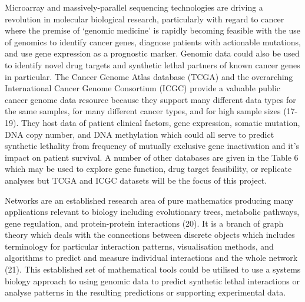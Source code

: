 Microarray and massively-parallel sequencing technologies are driving a revolution in molecular biological research, particularly with regard to cancer where the premise of ‘genomic medicine’ is rapidly becoming feasible with the use of genomics to identify cancer genes, diagnose patients with actionable mutations, and use gene expression as a prognostic marker. Genomic data could also be used to identify novel drug targets and synthetic lethal partners of known cancer genes in particular. The Cancer Genome Atlas database (TCGA) and the overarching International Cancer Genome Consortium (ICGC) provide a valuable public cancer genome data resource because they support many different data types for the same samples, for many different cancer types, and for high sample sizes (17-19). They host data of patient clinical factors, gene expression, somatic mutation, DNA copy number, and DNA methylation which could all serve to predict synthetic lethality from frequency of mutually exclusive gene inactivation and it’s impact on patient survival. A number of other databases are given in the Table 6 which may be used to explore gene function, drug target feasibility, or replicate analyses but TCGA and ICGC datasets will be the focus of this project.

Networks are an established research area of pure mathematics producing many applications relevant to biology including evolutionary trees, metabolic pathways, gene regulation, and protein-protein interactions (20). It is a branch of graph theory which deals with the connections between discrete objects which includes terminology for particular interaction patterns, visualisation methods, and algorithms to predict and measure individual interactions and the whole network (21). This established set of mathematical tools could be utilised to use a systems biology approach to using genomic data to predict synthetic lethal interactions or analyse patterns in the resulting predictions or supporting experimental data.

